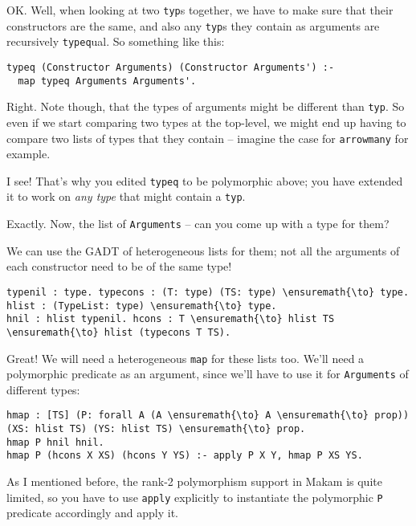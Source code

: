 \heroSTUDENT{} OK. Well, when looking at two \texttt{typ}s together, we have
to make sure that their constructors are the same, and also any
\texttt{typ}s they contain as arguments are recursively
\texttt{typeq}ual. So something like this:

\begin{verbatim}
typeq (Constructor Arguments) (Constructor Arguments') :-
  map typeq Arguments Arguments'.
\end{verbatim}

\heroADVISOR{} Right. Note though, that the types of arguments might be
different than \texttt{typ}. So even if we start comparing two types at
the top-level, we might end up having to compare two lists of types that
they contain -- imagine the case for \texttt{arrowmany} for example.

\heroSTUDENT{} I see! That's why you edited \texttt{typeq} to be polymorphic
above; you have extended it to work on \emph{any type} that might
contain a \texttt{typ}.

\heroADVISOR{} Exactly. Now, the list of \texttt{Arguments} -- can you come up
with a type for them?

\heroSTUDENT{} We can use the GADT of heterogeneous lists for them; not all
the arguments of each constructor need to be of the same type!

\begin{verbatim}
typenil : type. typecons : (T: type) (TS: type) \ensuremath{\to} type.
hlist : (TypeList: type) \ensuremath{\to} type.
hnil : hlist typenil. hcons : T \ensuremath{\to} hlist TS \ensuremath{\to} hlist (typecons T TS).
\end{verbatim}

\heroADVISOR{} Great! We will need a heterogeneous \texttt{map} for these
lists too. We'll need a polymorphic predicate as an argument, since
we'll have to use it for \texttt{Arguments} of different types:

\begin{verbatim}
hmap : [TS] (P: forall A (A \ensuremath{\to} A \ensuremath{\to} prop)) (XS: hlist TS) (YS: hlist TS) \ensuremath{\to} prop.
hmap P hnil hnil.
hmap P (hcons X XS) (hcons Y YS) :- apply P X Y, hmap P XS YS.
\end{verbatim}

As I mentioned before, the rank-2 polymorphism support in Makam is quite
limited, so you have to use \texttt{apply} explicitly to instantiate the
polymorphic \texttt{P} predicate accordingly and apply it.

